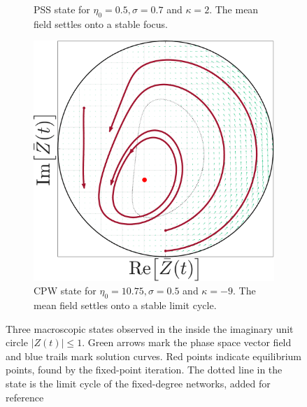 \begin{figure}[H]
\begin{subfigure}[b]{0.32\linewidth}
   \caption{PSS state for $\eta_0 = 0.5, \sigma = 0.7$ and $\kappa= 2$. The mean field settles onto a stable focus.}
   \label{fig:MFOARPSS_scalefree}
\end{subfigure} \hfill
\begin{subfigure}[b]{0.32\linewidth}
   \centering
  \includegraphics[width=\linewidth]{../Figures/PhaseSpace/MFOARCPW_scalefree.pdf}
   \caption{CPW state for $\eta_0 = 10.75, \sigma = 0.5$ and $\kappa= -9$. The mean field settles onto a stable limit cycle.}
   \label{fig:MFOARCPW_scalefree}
\end{subfigure}
   \caption{Three macroscopic states observed in the \MFR inside the imaginary unit circle $|Z(t)| \leqslant 1$. Green arrows mark the phase space vector field and blue trails mark solution curves. Red points indicate equilibrium points, found by the fixed-point iteration. The dotted line in the \CPW state is the limit cycle of the fixed-degree networks, added for reference}
   \label{fig:macroscopicstatesscalefreenetworks}
\end{figure}

